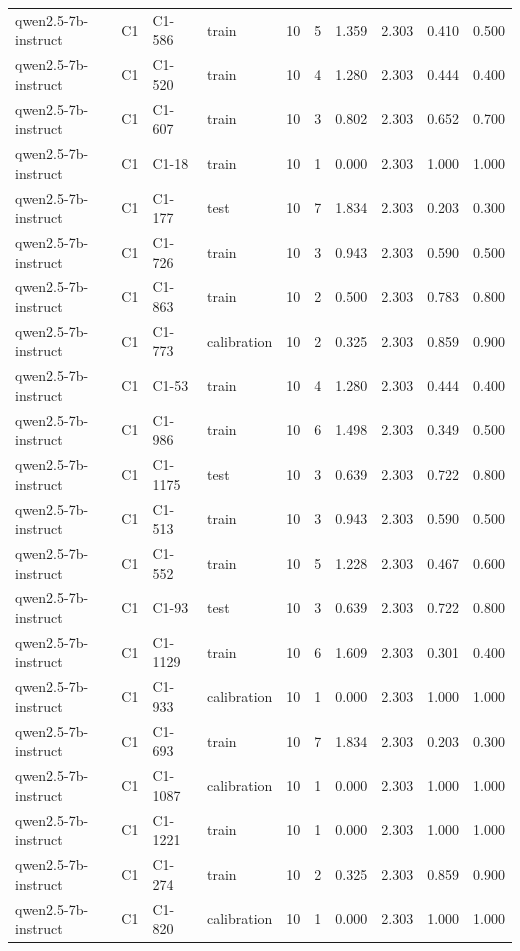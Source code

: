 \begin{table}
\begin{tabular}{llllrrrrrr}
qwen2.5-7b-instruct & C1 & C1-586 & train & 10 & 5 & 1.359 & 2.303 & 0.410 & 0.500 \\
qwen2.5-7b-instruct & C1 & C1-520 & train & 10 & 4 & 1.280 & 2.303 & 0.444 & 0.400 \\
qwen2.5-7b-instruct & C1 & C1-607 & train & 10 & 3 & 0.802 & 2.303 & 0.652 & 0.700 \\
qwen2.5-7b-instruct & C1 & C1-18 & train & 10 & 1 & 0.000 & 2.303 & 1.000 & 1.000 \\
qwen2.5-7b-instruct & C1 & C1-177 & test & 10 & 7 & 1.834 & 2.303 & 0.203 & 0.300 \\
qwen2.5-7b-instruct & C1 & C1-726 & train & 10 & 3 & 0.943 & 2.303 & 0.590 & 0.500 \\
qwen2.5-7b-instruct & C1 & C1-863 & train & 10 & 2 & 0.500 & 2.303 & 0.783 & 0.800 \\
qwen2.5-7b-instruct & C1 & C1-773 & calibration & 10 & 2 & 0.325 & 2.303 & 0.859 & 0.900 \\
qwen2.5-7b-instruct & C1 & C1-53 & train & 10 & 4 & 1.280 & 2.303 & 0.444 & 0.400 \\
qwen2.5-7b-instruct & C1 & C1-986 & train & 10 & 6 & 1.498 & 2.303 & 0.349 & 0.500 \\
qwen2.5-7b-instruct & C1 & C1-1175 & test & 10 & 3 & 0.639 & 2.303 & 0.722 & 0.800 \\
qwen2.5-7b-instruct & C1 & C1-513 & train & 10 & 3 & 0.943 & 2.303 & 0.590 & 0.500 \\
qwen2.5-7b-instruct & C1 & C1-552 & train & 10 & 5 & 1.228 & 2.303 & 0.467 & 0.600 \\
qwen2.5-7b-instruct & C1 & C1-93 & test & 10 & 3 & 0.639 & 2.303 & 0.722 & 0.800 \\
qwen2.5-7b-instruct & C1 & C1-1129 & train & 10 & 6 & 1.609 & 2.303 & 0.301 & 0.400 \\
qwen2.5-7b-instruct & C1 & C1-933 & calibration & 10 & 1 & 0.000 & 2.303 & 1.000 & 1.000 \\
qwen2.5-7b-instruct & C1 & C1-693 & train & 10 & 7 & 1.834 & 2.303 & 0.203 & 0.300 \\
qwen2.5-7b-instruct & C1 & C1-1087 & calibration & 10 & 1 & 0.000 & 2.303 & 1.000 & 1.000 \\
qwen2.5-7b-instruct & C1 & C1-1221 & train & 10 & 1 & 0.000 & 2.303 & 1.000 & 1.000 \\
qwen2.5-7b-instruct & C1 & C1-274 & train & 10 & 2 & 0.325 & 2.303 & 0.859 & 0.900 \\
qwen2.5-7b-instruct & C1 & C1-820 & calibration & 10 & 1 & 0.000 & 2.303 & 1.000 & 1.000 \\

\end{tabular}
\end{table}
